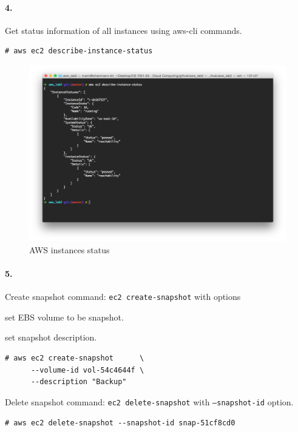\documentclass[a4paper]{article}
\begin{document}
\paragraph{4. } Get status information of all instances using aws-cli commands.
\begin{verbatim}
# aws ec2 describe-instance-status
\end{verbatim}
\begin{figure}[H]
  \centering
    \includegraphics[scale=.4]{instance_status.png}
  \caption{AWS instances status}
\end{figure}

\paragraph{5. } Create snapshot command: \texttt{ec2 create-snapshot} with options
\begin{description}
\leftskip 0.4in
\parindent -0.4in
	\item[\texttt{--volume-id} : ] set EBS volume to be snapshot.
	\item[\texttt{--description} : ] set snapshot description.
\end{description}
\begin{verbatim}
# aws ec2 create-snapshot      \
      --volume-id vol-54c4644f \
      --description "Backup"
\end{verbatim}

Delete snapshot command: \texttt{ec2 delete-snapshot} with \texttt{--snapshot-id} option.
\begin{verbatim}
# aws ec2 delete-snapshot --snapshot-id snap-51cf8cd0
\end{verbatim}
\end{document}
